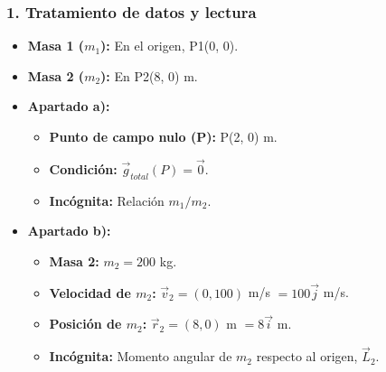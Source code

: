 \subsubsection*{1. Tratamiento de datos y lectura}
\begin{itemize}
    \item \textbf{Masa 1 ($m_1$):} En el origen, P1(0, 0).
    \item \textbf{Masa 2 ($m_2$):} En P2(8, 0) m.
    \item \textbf{Apartado a):}
    \begin{itemize}
        \item \textbf{Punto de campo nulo (P):} P(2, 0) m.
        \item \textbf{Condición:} $\vec{g}_{total}(P) = \vec{0}$.
        \item \textbf{Incógnita:} Relación $m_1/m_2$.
    \end{itemize}
    \item \textbf{Apartado b):}
    \begin{itemize}
        \item \textbf{Masa 2:} $m_2 = 200$ kg.
        \item \textbf{Velocidad de $m_2$:} $\vec{v}_2 = (0, 100)$ m/s $= 100\vec{j}$ m/s.
        \item \textbf{Posición de $m_2$:} $\vec{r}_2 = (8, 0)$ m $= 8\vec{i}$ m.
        \item \textbf{Incógnita:} Momento angular de $m_2$ respecto al origen, $\vec{L}_2$.
    \end{itemize}
\end{itemize}

